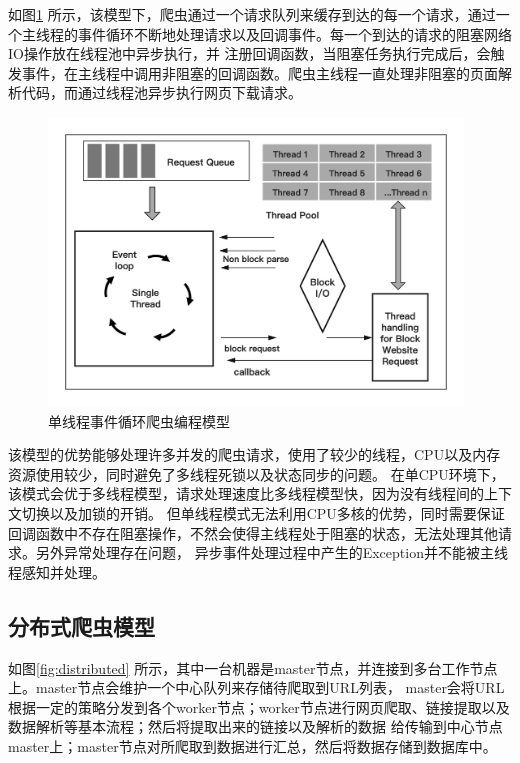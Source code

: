 \documentclass[master]{njuthesis}
\begin{document}
如图\ref{fig:singlemodel} 所示，该模型下，爬虫通过一个请求队列来缓存到达的每一个请求，通过一个主线程的事件循环不断地处理请求以及回调事件。每一个到达的请求的阻塞网络IO操作放在线程池中异步执行，并
注册回调函数，当阻塞任务执行完成后，会触发事件，在主线程中调用非阻塞的回调函数。爬虫主线程一直处理非阻塞的页面解析代码，而通过线程池异步执行网页下载请求。

\begin{figure}[htbp]
\centering
\includegraphics[width= 0.98\textwidth]{pic/model.png}
\caption{单线程事件循环爬虫编程模型}\label{fig:singlemodel}
\end{figure}


该模型的优势能够处理许多并发的爬虫请求，使用了较少的线程，CPU以及内存资源使用较少，同时避免了多线程死锁以及状态同步的问题。
在单CPU环境下，该模式会优于多线程模型，请求处理速度比多线程模型快，因为没有线程间的上下文切换以及加锁的开销。
但单线程模式无法利用CPU多核的优势，同时需要保证回调函数中不存在阻塞操作，不然会使得主线程处于阻塞的状态，无法处理其他请求。另外异常处理存在问题，
异步事件处理过程中产生的Exception并不能被主线程感知并处理。


\subsection{分布式爬虫模型}

如图\ref{fig:distributed} 所示，其中一台机器是master节点，并连接到多台工作节点上。master节点会维护一个中心队列来存储待爬取到URL列表，
master会将URL根据一定的策略分发到各个worker节点；worker节点进行网页爬取、链接提取以及数据解析等基本流程；然后将提取出来的链接以及解析的数据
给传输到中心节点master上；master节点对所爬取到数据进行汇总，然后将数据存储到数据库中\cite{brin1998anatomy}。
\end{document}

